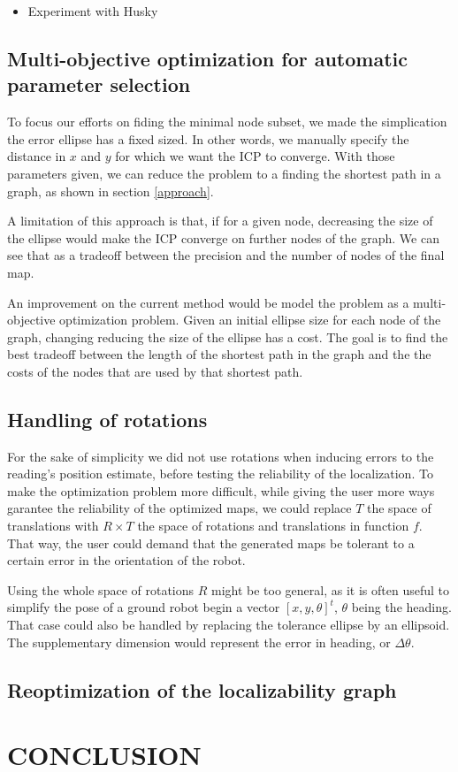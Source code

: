 \documentclass[letterpaper,10 pt,conference]{ieeeconf}
\begin{document}
\begin{itemize}
  \item Experiment with Husky
\end{itemize}

\subsection{Multi-objective optimization for automatic parameter selection}

To focus our efforts on fiding the minimal node subset, we made the simplication the error ellipse has a fixed sized.
In other words, we manually specify the distance in $x$ and $y$ for which we want the ICP to converge. With those parameters given,
we can reduce the problem to a finding the shortest path in a graph, as shown in section \ref{approach}.


A limitation of this approach is that, if for a given node, decreasing the size of the ellipse would make the ICP
converge on further nodes of the graph. We can see that as a tradeoff between the precision and the number of nodes of the final map.


An improvement on the current method would be model the problem as a multi-objective optimization problem. Given an initial
ellipse size for each node of the graph, changing reducing the size of the ellipse has a cost. The goal is to find the best
tradeoff between the length of the shortest path in the graph and the the costs of the nodes that are used by that shortest path.

\subsection{Handling of rotations}

For the sake of simplicity we did not use rotations when inducing errors to the reading's
position estimate, before testing the reliability of the localization. To make the optimization
problem more difficult, while giving the user more ways garantee the reliability of the optimized
maps, we could replace $T$ the space of translations with $R \times T$ the space of rotations and
translations in function $f$. That way, the user could demand that the generated maps be tolerant to
a certain error in the orientation of the robot.

Using the whole space of rotations $R$ might be too general, as it is often useful to simplify the pose of a
ground robot begin a vector $[x, y, \theta]^t$, $\theta$ being the heading. That case could also be
handled by replacing the tolerance ellipse by an ellipsoid. The supplementary dimension would
represent the error in heading, or $\Delta \theta$.

\subsection{Reoptimization of the localizability graph}



\section{CONCLUSION}
\end{document}

